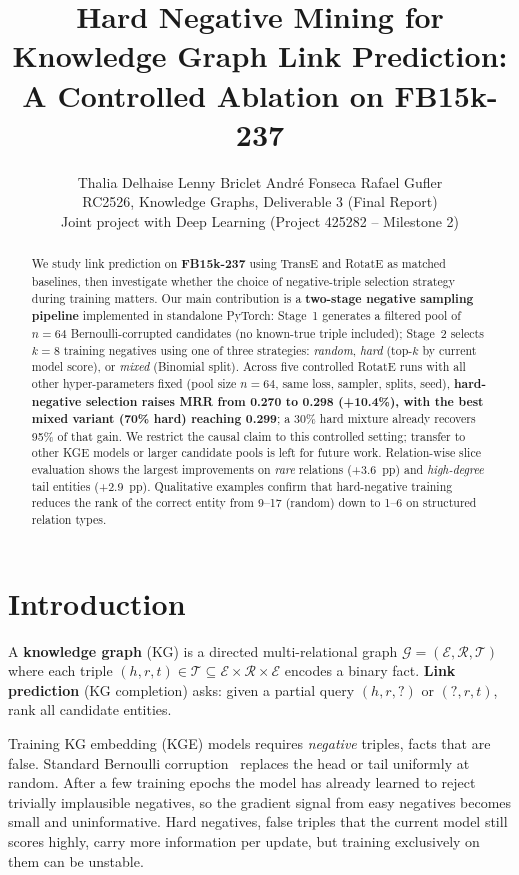 \documentclass[10pt,twocolumn,letterpaper]{article}
\title{Hard Negative Mining for Knowledge Graph Link Prediction:\\
A Controlled Ablation on FB15k-237}
\author{
  Thalia Delhaise \quad Lenny Briclet \quad Andr\'e Fonseca \quad Rafael Gufler \\
  RC2526, Knowledge Graphs, Deliverable 3 (Final Report) \\
  Joint project with Deep Learning (Project 425282 -- Milestone 2)
}
\begin{document}
\maketitle

\begin{abstract}
We study link prediction on \textbf{FB15k-237} using TransE and
RotatE as matched baselines, then investigate whether the choice of
negative-triple selection strategy during training matters. Our main contribution
is a \textbf{two-stage negative sampling pipeline} implemented in standalone
PyTorch: Stage~1 generates a filtered pool of $n\!=\!64$ Bernoulli-corrupted
candidates (no known-true triple included); Stage~2 selects $k\!=\!8$ training
negatives using one of three strategies: \emph{random}, \emph{hard}
(top-$k$ by current model score), or \emph{mixed} (Binomial split).
Across five controlled RotatE runs with all other hyper-parameters
fixed (pool size $n=64$, same loss, sampler, splits, seed),
\textbf{hard-negative selection raises MRR from 0.270 to 0.298 (+10.4\%),
with the best mixed variant (70\% hard) reaching 0.299};
a 30\% hard mixture already recovers 95\% of that gain.
We restrict the causal claim to this controlled setting; transfer to other
KGE models or larger candidate pools is left for future work.
Relation-wise slice evaluation shows the largest improvements on
\emph{rare} relations (+3.6~pp) and \emph{high-degree} tail entities (+2.9~pp).
Qualitative examples confirm that hard-negative training reduces the rank of
the correct entity from 9--17 (random) down to 1--6 on structured relation types.
\end{abstract}

\section{Introduction}
\label{sec:intro}

A \textbf{knowledge graph} (KG) is a directed multi-relational graph
$\mathcal{G}=(\mathcal{E},\mathcal{R},\mathcal{T})$ where each triple
$(h,r,t)\in\mathcal{T}\subseteq\mathcal{E}\times\mathcal{R}\times\mathcal{E}$
encodes a binary fact. \textbf{Link prediction} (KG completion) asks: given a
partial query $(h,r,?)$ or $(?,r,t)$, rank all candidate entities.

Training KG embedding (KGE) models requires \emph{negative} triples, facts
that are false. Standard Bernoulli corruption~\cite{wang2014knowledge} replaces
the head or tail uniformly at random. After a few training epochs the model has
already learned to reject trivially implausible negatives, so the gradient signal
from easy negatives becomes small and uninformative. Hard negatives, false
triples that the current model still scores highly, carry more information per
update, but training exclusively on them can be unstable.
\end{document}

